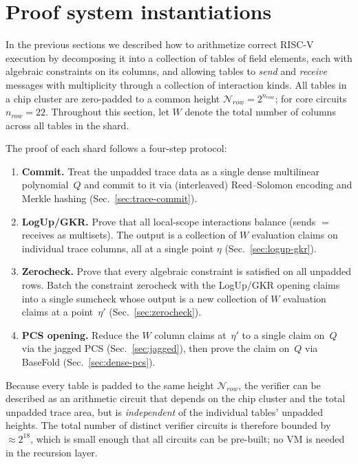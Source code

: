 \documentclass[11pt]{article}
\begin{document}
\section{Proof system instantiations}\label{sec:proof-system}

In the previous sections we described how to arithmetize correct RISC-V execution
by decomposing it into a collection of tables of field elements, each with algebraic constraints
on its columns, and
allowing tables to \emph{send} and \emph{receive} messages with multiplicity through
a collection of interaction kinds.
All tables in a chip cluster are zero-padded to a common height $\mathcal{N}_{row}=2^{n_{row}}$;
for core circuits $n_{row}=22$.
Throughout this section, let $W$ denote the total number of columns across all tables in the shard.

The proof of each shard follows a four-step protocol:
\begin{enumerate}
\item \textbf{Commit.}
      Treat the unpadded trace data as a single dense multilinear polynomial~$Q$
      and commit to it via (interleaved) Reed--Solomon encoding and Merkle hashing
      (Sec.~\ref{sec:trace-commit}).
\item \textbf{LogUp/GKR.}
      Prove that all local-scope interactions balance
      (sends $=$ receives as multisets).
      The output is a collection of $W$ evaluation claims on individual trace columns,
      all at a single point $\eta$
      (Sec.~\ref{sec:logup-gkr}).
\item \textbf{Zerocheck.}
      Prove that every algebraic constraint is satisfied on
      all unpadded rows.
      Batch the constraint zerocheck with the LogUp/GKR opening claims
      into a single sumcheck whose output is a new collection of $W$ evaluation claims at a
      point~$\eta'$
      (Sec.~\ref{sec:zerocheck}).
\item \textbf{PCS opening.}
      Reduce the $W$ column claims at~$\eta'$ to a single
      claim on~$Q$ via the jagged PCS (Sec.~\ref{sec:jagged}),
      then prove the claim on~$Q$ via BaseFold (Sec.~\ref{sec:dense-pcs}).
\end{enumerate}

Because every table is padded to the same height $\mathcal{N}_{row}$,
the verifier can be described as an arithmetic circuit that depends on the chip
cluster and the total unpadded trace area, but is \emph{independent} of the individual
tables' unpadded heights.
The total number of distinct verifier circuits is therefore bounded by $\approx 2^{18}$,
which is small enough that all circuits can be pre-built;
no VM is needed in the recursion layer.
\end{document}
